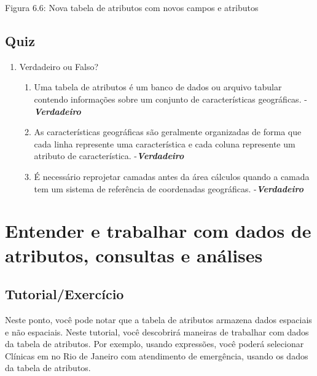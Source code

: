 \documentclass[
]{krantz}
\providecommand{\tightlist}{%
  \setlength{\itemsep}{0pt}\setlength{\parskip}{0pt}}
\begin{document}
Figura 6.6: Nova tabela de atributos com novos campos e atributos

\hypertarget{quiz-14}{%
\subsection{Quiz}\label{quiz-14}}

\begin{enumerate}
\def\labelenumi{\arabic{enumi}.}
\tightlist
\item
  Verdadeiro ou Falso?

  \begin{enumerate}
  \def\labelenumii{\arabic{enumii}.}
  \item
    Uma tabela de atributos é um banco de dados ou arquivo tabular contendo informações sobre um conjunto de características geográficas. -\textbf{\emph{Verdadeiro}}
  \item
    As características geográficas são geralmente organizadas de forma que cada linha represente uma característica e cada coluna represente um atributo de característica. -\textbf{\emph{Verdadeiro}}
  \item
    É necessário reprojetar camadas antes da área cálculos quando a camada tem um sistema de referência de coordenadas geográficas. -\textbf{\emph{Verdadeiro}}
  \end{enumerate}
\end{enumerate}

\hypertarget{entender-e-trabalhar-com-dados-de-atributos-consultas-e-anuxe1lises}{%
\section{Entender e trabalhar com dados de atributos, consultas e análises}\label{entender-e-trabalhar-com-dados-de-atributos-consultas-e-anuxe1lises}}

\hypertarget{tutorialexercuxedcio-5}{%
\subsection{Tutorial/Exercício}\label{tutorialexercuxedcio-5}}

Neste ponto, você pode notar que a tabela de atributos armazena dados espaciais e não espaciais. Neste tutorial, você descobrirá maneiras de trabalhar com dados da tabela de atributos. Por exemplo, usando expressões, você poderá selecionar Clínicas em no Rio de Janeiro com atendimento de emergência, usando os dados da tabela de atributos.
\end{document}
